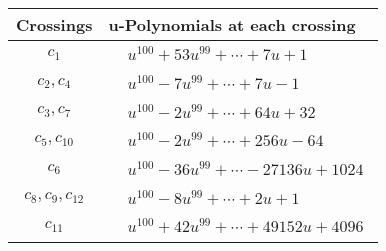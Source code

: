 \documentclass[1p]{elsarticle_modified}
\theoremstyle{definition}
\begin{document}
\begin{tabular}{m{50pt}|m{274pt}}
Crossings & \hspace{64pt}u-Polynomials at each crossing \\
\hline $$\begin{aligned}c_{1}\end{aligned}$$&$\begin{aligned}
&u^{100}+53 u^{99}+\cdots+7 u+1
\end{aligned}$\\
\hline $$\begin{aligned}c_{2},c_{4}\end{aligned}$$&$\begin{aligned}
&u^{100}-7 u^{99}+\cdots+7 u-1
\end{aligned}$\\
\hline $$\begin{aligned}c_{3},c_{7}\end{aligned}$$&$\begin{aligned}
&u^{100}-2 u^{99}+\cdots+64 u+32
\end{aligned}$\\
\hline $$\begin{aligned}c_{5},c_{10}\end{aligned}$$&$\begin{aligned}
&u^{100}-2 u^{99}+\cdots+256 u-64
\end{aligned}$\\
\hline $$\begin{aligned}c_{6}\end{aligned}$$&$\begin{aligned}
&u^{100}-36 u^{99}+\cdots-27136 u+1024
\end{aligned}$\\
\hline $$\begin{aligned}c_{8},c_{9},c_{12}\end{aligned}$$&$\begin{aligned}
&u^{100}-8 u^{99}+\cdots+2 u+1
\end{aligned}$\\
\hline $$\begin{aligned}c_{11}\end{aligned}$$&$\begin{aligned}
&u^{100}+42 u^{99}+\cdots+49152 u+4096
\end{aligned}$\\
\hline
\end{tabular}\\~\\
\newpage\renewcommand{\arraystretch}{1}
\end{document}
